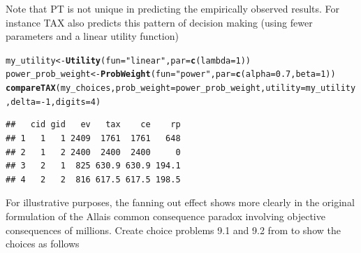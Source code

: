 \documentclass{article}\usepackage[]{graphicx}\usepackage[]{color}
\makeatletter
\newcommand{\hlnum}[1]{\textcolor[rgb]{0.686,0.059,0.569}{#1}}%
\newcommand{\hlstr}[1]{\textcolor[rgb]{0.192,0.494,0.8}{#1}}%
\newcommand{\hlopt}[1]{\textcolor[rgb]{0,0,0}{#1}}%
\newcommand{\hlstd}[1]{\textcolor[rgb]{0.345,0.345,0.345}{#1}}%
\newcommand{\hlkwb}[1]{\textcolor[rgb]{0.69,0.353,0.396}{#1}}%
\newcommand{\hlkwc}[1]{\textcolor[rgb]{0.333,0.667,0.333}{#1}}%
\newcommand{\hlkwd}[1]{\textcolor[rgb]{0.737,0.353,0.396}{\textbf{#1}}}%
\newenvironment{kframe}{%
 \def\at@end@of@kframe{}%
 \ifinner\ifhmode%
  \def\at@end@of@kframe{\end{minipage}}%
  \begin{minipage}{\columnwidth}%
 \fi\fi%
 \def\FrameCommand##1{\hskip\@totalleftmargin \hskip-\fboxsep
 \colorbox{shadecolor}{##1}\hskip-\fboxsep
     \hskip-\linewidth \hskip-\@totalleftmargin \hskip\columnwidth}%
 \MakeFramed {\advance\hsize-\width
   \@totalleftmargin\z@ \linewidth\hsize
   \@setminipage}}%
 {\par\unskip\endMakeFramed%
 \at@end@of@kframe}
\newenvironment{knitrout}{}{} %
\makeatother
\begin{document}
Note that PT is not unique in predicting the empirically observed results. For instance TAX also predicts this pattern of decision making (using fewer parameters and a linear utility function)

\begin{knitrout}
\color{fgcolor}\begin{kframe}
\begin{alltt}
\hlstd{my_utility} \hlkwb{<-} \hlkwd{Utility}\hlstd{(}\hlkwc{fun}\hlstd{=}\hlstr{"linear"}\hlstd{,} \hlkwc{par}\hlstd{=}\hlkwd{c}\hlstd{(}\hlkwc{lambda}\hlstd{=}\hlnum{1}\hlstd{))}
\hlstd{power_prob_weight} \hlkwb{<-} \hlkwd{ProbWeight}\hlstd{(}\hlkwc{fun}\hlstd{=}\hlstr{"power"}\hlstd{,} \hlkwc{par}\hlstd{=}\hlkwd{c}\hlstd{(}\hlkwc{alpha}\hlstd{=}\hlnum{0.7}\hlstd{,} \hlkwc{beta}\hlstd{=}\hlnum{1}\hlstd{))}
\hlkwd{compareTAX}\hlstd{(my_choices,} \hlkwc{prob_weight}\hlstd{=power_prob_weight,} \hlkwc{utility}\hlstd{=my_utility,} \hlkwc{delta}\hlstd{=}\hlopt{-}\hlnum{1}\hlstd{,} \hlkwc{digits}\hlstd{=}\hlnum{4}\hlstd{)}
\end{alltt}
\begin{verbatim}
##   cid gid   ev   tax    ce    rp
## 1   1   1 2409  1761  1761   648
## 2   1   2 2400  2400  2400     0
## 3   2   1  825 630.9 630.9 194.1
## 4   2   2  816 617.5 617.5 198.5
\end{verbatim}
\end{kframe}
\end{knitrout}


For illustrative purposes, the fanning out effect shows more clearly in the original formulation of the
Allais common consequence paradox involving objective consequences of millions. Create choice problems 9.1 and 9.2 from \citet[][Table 2 p. 480]{Birnbaum_2008}
to show the choices as follows
\end{document}
